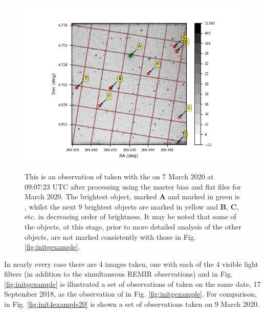 \begin{figure}[!htbp]
\begin{center}
\includegraphics[scale=1]{images/initgexample20.png}
\end{center}   
\caption{This is an observation of {\bstar} taken with the {\gfilter} on
7 March 2020 at 09:07:23 UTC after processing using the master bias and
flat files for March 2020. The brightest object, marked \textbf{A} and marked in
green is \bstar, whilst the next 9 brightest objects are marked in yellow and
\textbf{B}, \textbf{C}, etc. in decreasing order of brightness. It may be
noted that some of the objects, at this stage, prior to more detailed analysis
of the other objects, are not marked consistently with those in Fig. \ref{fig:initgexample}.}
\protect\label{fig:initgexample20}
\end{figure}

In nearly every case there are 4 images taken, one with each of the 4 visible
light filters (in addition to the simultaneous REMIR observations) and in Fig.
\ref{fig:initgexample} is illustrated a set of observations of {\prox} taken on
the same date, 17 September 2018, as the observation of {\bstar} in Fig.
\ref{fig:initgexample}. For comparison, in Fig. \ref{fig:init4example20} is
shown a set of observations taken on 9 March 2020.

